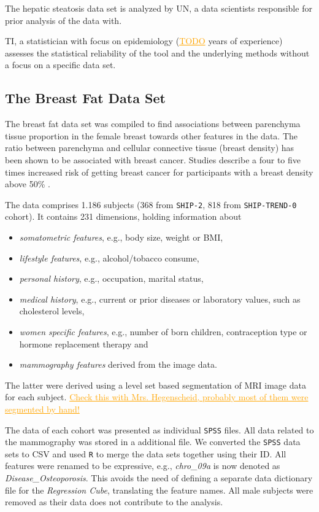 \documentclass[journal]{style/vgtc} 			          %
\newcommand{\com}[1]{\textcolor{orange}{\uline{#1}}}
\begin{document}
The hepatic steatosis data set is analyzed by UN, a data scientists responsible for prior analysis of the data with.

TI, a statistician with focus on epidemiology (\com{TODO} years of experience) assesses the statistical reliability of the tool and the underlying methods without a focus on a specific data set.
\subsection{The Breast Fat Data Set}
The breast fat data set was compiled to find associations between parenchyma tissue proportion in the female breast towards other features in the data.
The ratio between parenchyma and cellular connective tissue (breast density) has been shown to be associated with breast cancer.
Studies describe a four to five times increased risk of getting breast cancer for participants with a breast density above 50\% \cite{Mccormack2006}.

The data comprises 1.186 subjects (368 from \texttt{SHIP-2}, 818 from \texttt{SHIP-TREND-0} cohort).
It contains 231 dimensions, holding information about
\begin{itemize}
	\item \emph{somatometric features}, e.g., body size, weight or BMI, 
	\item \emph{lifestyle features}, e.g., alcohol/tobacco consume, 
	\item \emph{personal history}, e.g., occupation, marital status,
	\item \emph{medical history}, e.g., current or prior diseases or laboratory values, such as cholesterol levels,
	\item \emph{women specific features}, e.g., number of born children, contraception type or hormone replacement therapy and
	\item \emph{mammography features} derived from the image data.
\end{itemize}
The latter were derived using a level set based segmentation \cite{Ivanovska2014} of MRI image data for each subject.
\com{Check this with Mrs. Hegenscheid, probably most of them were segmented by hand!}

The data of each cohort was presented as individual \texttt{SPSS} files.
All data related to the mammography was stored in a additional file.
We converted the \texttt{SPSS} data sets to CSV and used \texttt{R} to merge the data sets together using their ID.
All features were renamed to be expressive, e.g., \emph{chro\_09a} is now denoted as \emph{Disease\_Osteoporosis}.
This avoids the need of defining a separate data dictionary file for the \emph{Regression Cube}, translating the feature names.
All male subjects were removed as their data does not contribute to the analysis.
\end{document}

